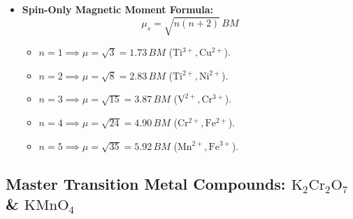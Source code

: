 \documentclass[10pt,twoside,openright]{book}
\begin{document}
\begin{itemize}
  \item \textbf{Spin-Only Magnetic Moment Formula:}
  \begin{equation}
    \mu_s = \sqrt{n(n + 2)}\,\si{BM}
  \end{equation}
  \begin{itemize}
    \item $n=1 \implies \mu = \sqrt{3} = 1.73\,\si{BM}$ ($\mathrm{Ti^{3+}, Cu^{2+}}$).
    \item $n=2 \implies \mu = \sqrt{8} = 2.83\,\si{BM}$ ($\mathrm{Ti^{2+}, Ni^{2+}}$).
    \item $n=3 \implies \mu = \sqrt{15} = 3.87\,\si{BM}$ ($\mathrm{V^{2+}, Cr^{3+}}$).
    \item $n=4 \implies \mu = \sqrt{24} = 4.90\,\si{BM}$ ($\mathrm{Cr^{2+}, Fe^{2+}}$).
    \item $n=5 \implies \mu = \sqrt{35} = 5.92\,\si{BM}$ ($\mathrm{Mn^{2+}, Fe^{3+}}$).
  \end{itemize}
\end{itemize}

\subsection{Master Transition Metal Compounds: $\mathrm{K_2Cr_2O_7}$ \& $\mathrm{KMnO_4}$}
\end{document}
